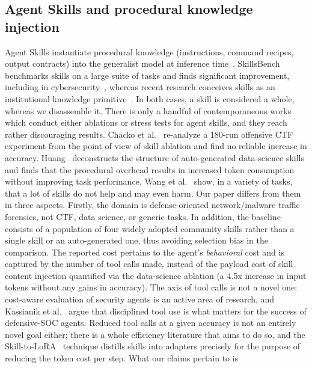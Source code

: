 \documentclass[conference]{IEEEtran}
\begin{document}
\subsection{Agent Skills and procedural knowledge injection}
Agent Skills instantiate procedural knowledge (instructions, command recipes, output
contracts) into the generalist model at inference
time~\cite{anthropicskills2026,anthropicskills_blog,agentskillsio2026}. SkillsBench
benchmarks skills on a large suite of tasks and finds significant improvement, including in
cybersecurity~\cite{skillsbench2026}, whereas recent research conceives skills as an
institutional knowledge primitive~\cite{knowledgeactivation2026}. In both cases, a skill is
considered a whole, whereas we disassemble it. There is only a handful of contemporaneous
works which conduct either ablations or stress tests for agent skills, and they reach rather
discouraging results. Chacko et al.~\cite{whenskills2026} re-analyze a 180-run offensive CTF
experiment from the point of view of skill ablation and find no reliable increase in
accuracy. Huang~\cite{datascienceskills2026} deconstructs the structure of auto-generated
data-science skills and finds that the procedural overhead results in increased token
consumption without improving task performance. Wang et al.~\cite{notallskills2026} show, in
a variety of tasks, that a lot of skills do not help and may even harm. Our paper differs
from them in three aspects. Firstly, the domain is defense-oriented network/malware traffic
forensics, not CTF, data science, or generic tasks. In addition, the baseline consists of a
population of four widely adopted community skills rather than a single skill or an
auto-generated one, thus avoiding selection bias in the comparison. The reported cost
pertains to the agent's \emph{behavioral} cost and is captured by the number of tool calls
made, instead of the payload cost of skill content injection quantified via the data-science
ablation (a 4.5x increase in input tokens without any gains in accuracy). The axis of tool
calls is not a novel one: cost-aware evaluation of security agents is an active area of
research, and Kassianik et al.~\cite{costaware2026} argue that disciplined tool use is what
matters for the success of defensive-SOC agents. Reduced tool calls at a given accuracy is
not an entirely novel goal either; there is a whole efficiency literature that aims to do
so, and the Skill-to-LoRA~\cite{skilltolora2026} technique distills skills into adapters
precisely for the purpose of reducing the token cost per step. What our claims pertain to is
\end{document}

